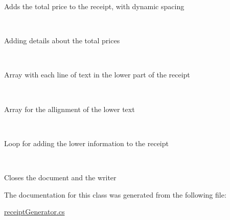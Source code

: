 Adds the total price to the receipt, with dynamic spacing 

~\newline
~\newline
~\newline
~\newline
~\newline
 

Adding details about the total prices 

~\newline
~\newline
~\newline
~\newline
 

Array with each line of text in the lower part of the receipt 

~\newline
~\newline
~\newline
 

Array for the allignment of the lower text 

~\newline
~\newline
 

Loop for adding the lower information to the receipt 

~\newline
 

Closes the document and the writer 

The documentation for this class was generated from the following file\+:\begin{DoxyCompactItemize}
\item 
\mbox{\hyperlink{receipt_generator_8cs}{receipt\+Generator.\+cs}}\end{DoxyCompactItemize}
